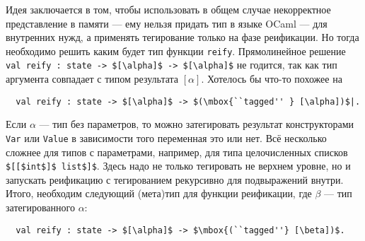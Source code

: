Идея заключается в том, чтобы использовать в общем случае некорректное представление в памяти --- ему нельзя придать тип в языке OCaml --- для внутренних нужд, а применять тегирование только на фазе реификации. Но тогда необходимо решить каким будет тип функции \lstinline|reify|.
Прямолинейное решение \lstinline|val reify : state -> $[\alpha]$ -> $[\alpha]$|
не годится, так как тип аргумента совпадает с типом результата $[\alpha]$.
Хотелось бы что-то похожее на
\begin{lstlisting}
  val reify : state -> $[\alpha]$ -> $(\mbox{``tagged'' } [\alpha])$|.
\end{lstlisting}
%

Если $\alpha$ --- тип без параметров, то можно затегировать результат конструкторами \lstinline|Var| или \lstinline|Value|  в зависимости того переменная это или нет.
Всё несколько сложнее для типов с параметрами, например, для типа целочисленных списков \lstinline|$[[$int$]$ list$]$|.
Здесь надо не только тегировать не верхнем уровне, но и запускать реификацию с тегированием рекурсивно для подвыражений внутри.
Итого, необходим следующий (мета)тип для функции реификации, где $\beta$ --- тип затегированного $\alpha$: %
%
%
\begin{lstlisting}
  val reify : state -> $[\alpha]$ -> $\mbox{(``tagged''} [\beta])$.
\end{lstlisting}
%

